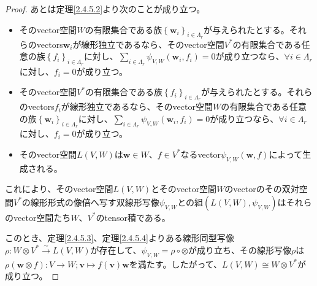 \documentclass[dvipdfmx]{jsarticle}
\begin{document}
\begin{proof}
あとは定理\ref{2.4.5.2}より次のことが成り立つ。
\begin{itemize}
\item
  そのvector空間$W$の有限集合である族$\left\{ \mathbf{w}_{i} \right\}_{i \in \varLambda_{r}}$が与えられたとする。それらのvectors$\mathbf{w}_{i}$が線形独立であるなら、そのvector空間$V^{*}$の有限集合である任意の族$\left\{ f_{i} \right\}_{i \in \varLambda_{r}}$に対し、$\sum_{i \in \varLambda_{r}} {\psi_{V,W}\left( \mathbf{w}_{i},f_{i} \right)} = 0$が成り立つなら、$\forall i \in \varLambda_{r}$に対し、$f_{i} = 0$が成り立つ。
\item
  そのvector空間$V^{*}$の有限集合である族$\left\{ f_{i} \right\}_{i \in \varLambda_{r}}$が与えられたとする。それらのvectors$f_{i}$が線形独立であるなら、そのvector空間$W$の有限集合である任意の族$\left\{ \mathbf{w}_{i} \right\}_{i \in \varLambda_{r}}$に対し、$\sum_{i \in \varLambda_{r}} {\psi_{V,W}\left( \mathbf{w}_{i},f_{i} \right)} = 0$が成り立つなら、$\forall i \in \varLambda_{r}$に対し、$f_{i} = 0$が成り立つ。
\item
  そのvector空間$L(V,W)$は$\mathbf{w} \in W$、$f \in V^{*}$なるvector$\psi_{V,W}\left( \mathbf{w},f \right)$によって生成される。
\end{itemize}
これにより、そのvector空間$L(V,W)$とそのvector空間$W$のvectorのその双対空間$V^{*}$の線形形式の像倍へ写す双線形写像$\psi_{V,W}$との組$\left( L(V,W),\psi_{V,W} \right)$はそれらのvector空間たち$W$、$V^{*}$のtensor積である。\par
このとき、定理\ref{2.4.5.3}、定理\ref{2.4.5.4}よりある線形同型写像$\rho:W \otimes V^{*}\overset{\sim}{\rightarrow}L(V,W)$が存在して、$\psi_{V,W} = \rho \circ \otimes$が成り立ち、その線形写像$\rho$は$\rho\left( \mathbf{w} \otimes f \right):V \rightarrow W;\mathbf{v} \mapsto f\left( \mathbf{v} \right)\mathbf{w}$を満たす。したがって、$L(V,W) \cong W \otimes V^{*}$が成り立つ。
\end{proof}
\end{document}
